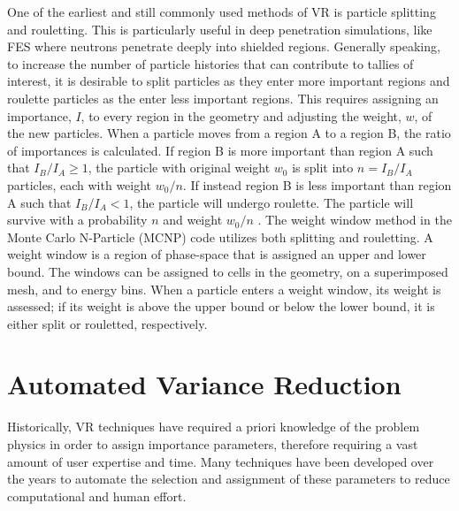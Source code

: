 One of the earliest and still commonly used methods of VR is particle splitting
and rouletting.  This is particularly useful in deep penetration simulations,
like FES where neutrons penetrate deeply into shielded regions.  
Generally speaking, to increase the number of particle
histories that can contribute to tallies of interest, it is desirable to split
particles as they enter more important regions and roulette particles as the
enter less important regions. 
This requires assigning an importance, $I$, to every
region in the geometry and adjusting the weight, $w$, of the new particles. 
When a particle moves from a region A to a region B,
the ratio of importances is calculated.  If region B is more important than
region A such that 
$I_{B}/I_{A} \geqslant 1$, 
the particle with original weight $w_{0}$ is split into 
$n = I_{B}/I_{A}$
particles, each with weight $w_{0}/n$.  If instead region B is less important
than region A such that
$I_{B}/I_{A} < 1$, 
the particle will undergo roulette. 
The particle will survive with a probability $n$ and weight $w_{0}/n$
\cite{Carter_Cashwell_1975}.
The weight window method in the Monte Carlo N-Particle (MCNP) code utilizes both splitting and
rouletting.  A weight window is a region of phase-space that is assigned an upper and
lower bound.  The windows can be assigned to cells in the geometry, on a
superimposed mesh, and to energy bins.  When a particle enters a weight window, its weight is assessed; if
its weight is above the upper bound or below the lower bound, it is either split
or rouletted, respectively.


\section{Automated Variance Reduction}\label{sec:auto_vr}

Historically, VR techniques have required a priori knowledge of the problem physics
in order to assign importance parameters, therefore requiring a vast amount of
user expertise and time.
Many techniques have been developed over the years to automate the selection and
assignment of these parameters to reduce computational and human effort.

